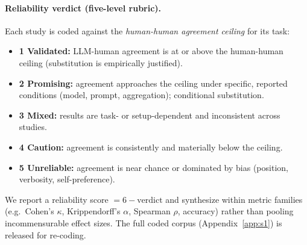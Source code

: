 \paragraph{Reliability verdict (five-level rubric).} Each study is coded against the \emph{human-human agreement
ceiling} for its task:
\begin{itemize}[leftmargin=1.4em,itemsep=1pt]
\item \textbf{1 Validated:} LLM-human agreement is at or above the human-human ceiling (substitution is empirically
justified).
\item \textbf{2 Promising:} agreement approaches the ceiling under specific, reported conditions (model, prompt,
aggregation); conditional substitution.
\item \textbf{3 Mixed:} results are task- or setup-dependent and inconsistent across studies.
\item \textbf{4 Caution:} agreement is consistently and materially below the ceiling.
\item \textbf{5 Unreliable:} agreement is near chance or dominated by bias (position, verbosity, self-preference).
\end{itemize}
We report a reliability score $=6-\text{verdict}$ and synthesize within metric families (e.g.\ Cohen's $\kappa$,
Krippendorff's $\alpha$, Spearman $\rho$, accuracy) rather than pooling incommensurable effect sizes. The full coded corpus (Appendix~\ref{app:s1}) is released for re-coding.

